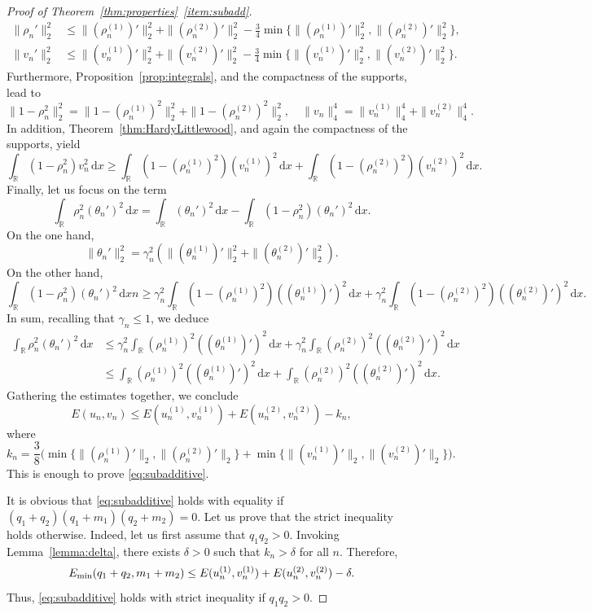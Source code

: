 \documentclass[11pt]{article}
\newcommand{\R}{\mathbb{R}}
\newcommand{\Emin}{E_\textup{min}}
\renewcommand{\d}{\,\mathrm{d}}
\theoremstyle{plain}
\theoremstyle{definition}
\theoremstyle{remark}
\numberwithin{equation}{section}
\begin{document}
{\begin{proof}[Proof of Theorem~\ref{thm:properties}~\ref{item:subadd}]
\begin{align*}
        \|\rho_n'\|_2^2&\leq \|(\rho_n^{(1)})'\|_2^2 + \|(\rho_n^{(2)})'\|^2_2 - \frac34\min\{\|(\rho_n^{(1)})'\|_2^2,\|(\rho_n^{(2)})'\|_2^2\},
        \\
        \|v_n'\|_2^2&\leq \|(v_n^{(1)})'\|_2^2 + \|(v_n^{(2)})'\|^2_2 - \frac34\min\{\|(v_n^{(1)})'\|_2^2,\|(v_n^{(2)})'\|_2^2\}.
    \end{align*}
    Furthermore,  Proposition~\ref{prop:integrals}, and the compactness of the supports, lead to
    \begin{equation*}
        \|1-\rho_n^2\|_2^2= \|1-(\rho_n^{(1)})^2\|_2^2+\|1-(\rho_n^{(2)})^2\|_2^2,\quad
        \|v_n\|_4^4= \|v_n^{(1)}\|_4^4+\|v_n^{(2)}\|_4^4.
    \end{equation*}
    In addition,  Theorem~\ref{thm:HardyLittlewood}, and again the compactness of the supports, yield
    \[\int_\R(1-\rho_n^2)v_n^2\d x\geq \int_\R(1-(\rho_n^{(1)})^2)(v_n^{(1)})^2\d x + \int_\R(1-(\rho_n^{(2)})^2)(v_n^{(2)})^2\d x.\]
    Finally, let us focus on the term 
    \[\int_\R\rho_n^2(\theta_n')^2\d x=\int_\R(\theta_n')^2\d x-\int_\R(1-\rho_n^2)(\theta_n')^2\d x.\] 
    On the one hand,
    \[\|\theta_n'\|_2^2=\gamma_n^2(\|(\theta_n^{(1)})'\|_2^2+\|(\theta_n^{(2)})'\|_2^2).\]
    On the other hand,
    \[\int_\R(1-\rho_n^2)(\theta_n')^2\d xn\geq \gamma_n^2\int_\R(1-(\rho_n^{(1)})^2)((\theta_n^{(1)})')^2\d x + \gamma_n^2\int_\R(1-(\rho_n^{(2)})^2)((\theta_n^{(2)})')^2\d x.\]
    In sum, recalling that $\gamma_n\leq 1$, we deduce
    \begin{align*}
        \int_\R\rho_n^2(\theta_n')^2\d x&\leq \gamma_n^2\int_\R(\rho_n^{(1)})^2((\theta_n^{(1)})')^2\d x + \gamma_n^2\int_\R(\rho_n^{(2)})^2((\theta_n^{(2)})')^2\d x
        \\
        &\leq \int_\R(\rho_n^{(1)})^2((\theta_n^{(1)})')^2\d x + \int_\R(\rho_n^{(2)})^2((\theta_n^{(2)})')^2\d x.
    \end{align*}
    Gathering the estimates together, we conclude
    \[E(u_n,v_n)\leq E(u_n^{(1)},v_n^{(1)})+E(u_n^{(2)},v_n^{(2)})-k_n,\]
    where 
    \begin{equation}\label{kn}
    k_n={\frac38}\Big(\min\{\|(\rho_n^{(1)})'\|_2,\|(\rho_n^{(2)})'\|_2\}+\min\{\|(v_n^{(1)})'\|_2,\|(v_n^{(2)})'\|_2\}\Big).
    \end{equation}
    This is enough to prove \eqref{eq:subadditive}. 
    
   It is obvious that \eqref{eq:subadditive} holds with equality if  $(q_1+q_2)(q_1+m_1)(q_2+m_2)=0$. Let us prove that the strict inequality holds otherwise. Indeed, let us first assume that $q_1q_2>0$.   Invoking Lemma~\ref{lemma:delta}, there exists $\delta>0$ such that $k_n>\delta$ for all $n$. Therefore,
    \[\Emin(q_1+q_2,m_1+m_2)\leq E(u_n^{(1)},v_n^{(1)})+E(u_n^{(2)},v_n^{(2)})-\delta.\]
    Thus, \eqref{eq:subadditive} holds with strict inequality if $q_1q_2>0$. 
    

\end{proof}}
\end{document}
